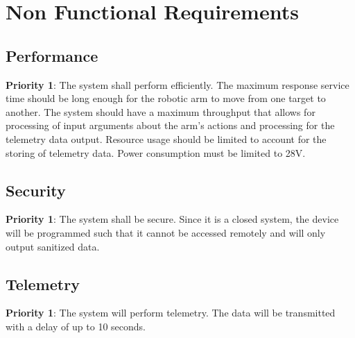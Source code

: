 \documentclass[letterpaper,10pt]{article}
\begin{document}
\section{Non Functional Requirements}
\subsection{Performance}
\textbf{Priority 1}: The system shall perform efficiently. The maximum response service time should be long enough for the robotic arm to move from one target to another.
 The system should have a maximum throughput that allows for processing of input arguments about the arm's actions and processing for the telemetry data output. 
 Resource usage should be limited to account for the storing of telemetry data. Power consumption must be limited to 28V.
\subsection{Security}
\textbf{Priority 1}: The system shall be secure. Since it is a closed system, the device will be programmed such that it cannot be accessed remotely and will only output sanitized data.
\subsection{Telemetry}
\textbf{Priority 1}: The system will perform telemetry. The data will be transmitted with a delay of up to 10 seconds.
\end{document}

